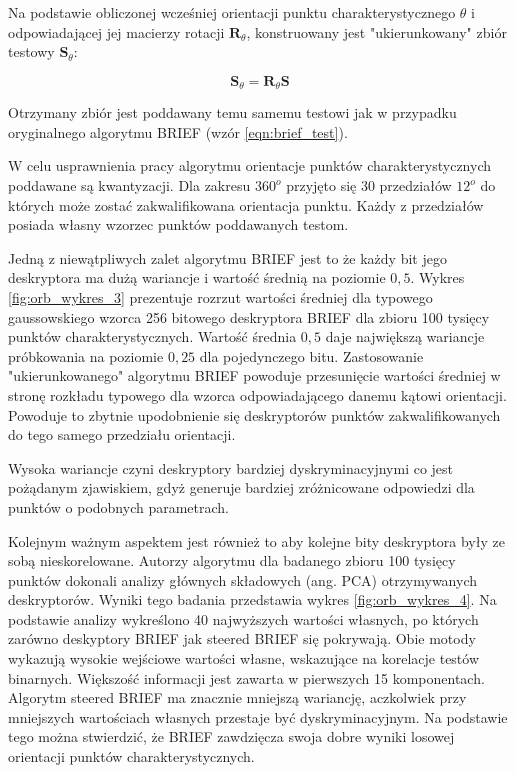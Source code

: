 Na podstawie obliczonej wcześniej orientacji punktu charakterystycznego $\theta$ i odpowiadającej jej macierzy rotacji $\textbf{R}_{\theta}$, konstruowany jest "ukierunkowany" zbiór testowy $\textbf{S}_{\theta}$:

\begin{equation}
\textbf{S}_\theta = \textbf{R}_\theta \textbf{S}
\end{equation}

Otrzymany zbiór jest poddawany temu samemu testowi jak w przypadku oryginalnego algorytmu BRIEF (wzór \ref{eqn:brief_test}).

W celu usprawnienia pracy algorytmu orientacje punktów charakterystycznych poddawane są kwantyzacji. Dla zakresu $360^o$ przyjęto się 30 przedziałów $12^o$ do których może zostać zakwalifikowana orientacja punktu. Każdy z przedziałów posiada własny wzorzec punktów poddawanych testom.

Jedną z niewątpliwych zalet algorytmu BRIEF jest to że każdy bit jego deskryptora ma dużą wariancje i wartość średnią na poziomie $0,5$. Wykres \ref{fig:orb_wykres_3} prezentuje rozrzut wartości średniej dla typowego gaussowskiego wzorca 256 bitowego deskryptora BRIEF dla zbioru 100 tysięcy punktów charakterystycznych. Wartość średnia $0,5$ daje największą wariancje próbkowania na poziomie $0,25$ dla pojedynczego bitu. Zastosowanie "ukierunkowanego" algorytmu BRIEF powoduje przesunięcie wartości średniej w stronę rozkładu typowego dla wzorca odpowiadającego danemu kątowi orientacji. Powoduje to zbytnie upodobnienie się deskryptorów punktów zakwalifikowanych do tego samego przedziału orientacji.

Wysoka wariancje czyni deskryptory bardziej dyskryminacyjnymi co jest pożądanym zjawiskiem, gdyż generuje bardziej zróżnicowane odpowiedzi dla punktów o podobnych parametrach. 

Kolejnym ważnym aspektem  jest również to aby kolejne bity deskryptora były ze sobą nieskorelowane. Autorzy algorytmu dla badanego zbioru 100 tysięcy punktów dokonali analizy głównych składowych (ang. PCA) otrzymywanych deskryptorów. Wyniki tego badania przedstawia wykres \ref{fig:orb_wykres_4}. Na podstawie analizy wykreślono 40 najwyższych wartości własnych, po których zarówno deskyptory BRIEF jak steered BRIEF się pokrywają. Obie motody wykazują wysokie wejściowe wartości własne, wskazujące na korelacje testów binarnych. Większość informacji jest zawarta w pierwszych 15 komponentach. Algorytm steered BRIEF ma znacznie mniejszą wariancję, aczkolwiek przy mniejszych wartościach własnych przestaje być dyskryminacyjnym. Na podstawie tego można stwierdzić, że BRIEF zawdzięcza swoja dobre wyniki losowej orientacji punktów charakterystycznych.

